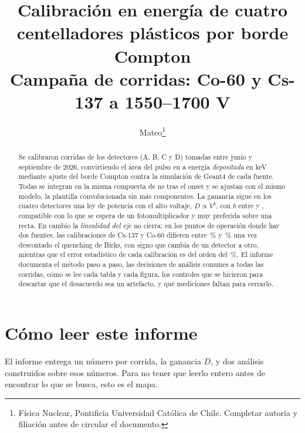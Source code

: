 \documentclass[11pt,a4paper]{article}
\title{\color{azul}\bfseries Calibración en energía de cuatro centelladores
       plásticos por borde Compton\\[2mm]
       \normalsize\mdseries\color{black}
       Campaña de \NCorridas{} corridas: Co-60 y Cs-137 a 1550--1700 V}
\author{Mateo\thanks{Física Nuclear, Pontificia Universidad Católica de Chile.
        Completar autoría y filiación antes de circular el documento.}}
\date{\FechaInforme}
\begin{document}
\maketitle

\begin{abstract}
\noindent
Se calibraron \NCorridas{} corridas de los \NDetectores{} detectores (A, B, C
y D) tomadas entre junio y septiembre de 2026, convirtiendo el área del pulso
en \mVns{} a energía \emph{depositada} en keV mediante ajuste del borde Compton
contra la simulación de Geant4 de cada fuente. Todas se integran en la misma
compuerta de \PostFijo{} ns tras el onset y se ajustan con el mismo modelo, la
plantilla convolucionada sin más componentes. La ganancia sigue en los cuatro
detectores una ley de potencia con el alto voltaje, $D \propto V^{b}$, con
$b$ entre \BMin{} y \BMax{}, compatible con lo que se espera de un
fotomultiplicador y muy preferida sobre una recta. En cambio la
\emph{linealidad del eje} no cierra: en los \NPuntosTestA{} puntos de operación
donde hay dos fuentes, las calibraciones de Cs-137 y Co-60 difieren entre
\DesacMin\,\% y \DesacMax\,\% una vez descontado el quenching de Birks, con
signo que cambia de un detector a otro, mientras que el error estadístico de
cada calibración es del orden del \ErrRelMediano\,\%. El informe documenta el
método paso a paso, las decisiones de análisis comunes a todas las corridas,
cómo se lee cada tabla y cada figura, los controles que se hicieron para
descartar que el desacuerdo sea un artefacto, y qué mediciones faltan para
cerrarlo.
\end{abstract}

\tableofcontents
\bigskip

\section{Cómo leer este informe}
\label{sec:comoleer}

El informe entrega un número por corrida, la ganancia $D$, y dos análisis
construidos sobre esos números. Para no tener que leerlo entero antes de
encontrar lo que se busca, esto es el mapa.
\end{document}
